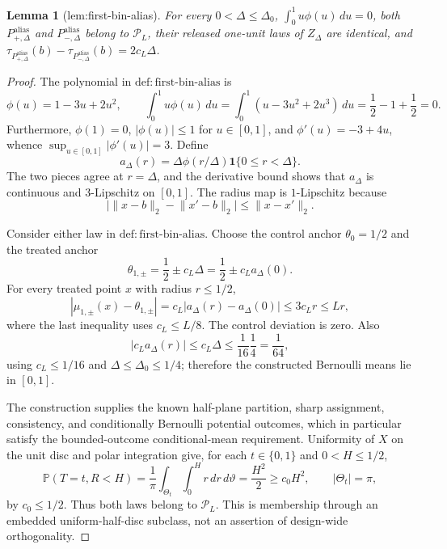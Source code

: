 \documentclass{article}
\newtheorem{lemma}{Lemma}
\begin{document}
\begin{lemma}[lem:first-bin-alias]\label{lem:first-bin-alias}
For every \(0<\Delta\leq\Delta_0\), \(\int_0^1u\phi(u)\,du=0\), both \(P^{\mathrm{alias}}_{+,\Delta}\) and \(P^{\mathrm{alias}}_{-,\Delta}\) belong to \(\mathcal P_L\), their released one-unit laws of \(Z_\Delta\) are identical, and \(\tau_{P^{\mathrm{alias}}_{+,\Delta}}(b)-\tau_{P^{\mathrm{alias}}_{-,\Delta}}(b)=2c_L\Delta\).
\end{lemma}
\begin{proof}
The polynomial in \(\mathrm{def:first\text{-}bin\text{-}alias}\) is
\[
 \phi(u)=1-3u+2u^2,
 \qquad
 \int_0^1u\phi(u)\,du
 =\int_0^1(u-3u^2+2u^3)\,du
 =\frac12-1+\frac12=0.
\]
Furthermore, \(\phi(1)=0\), \(|\phi(u)|\leq1\) for \(u\in[0,1]\), and \(\phi'(u)=-3+4u\), whence \(\sup_{u\in[0,1]}|\phi'(u)|=3\).  Define
\[
 a_\Delta(r)=\Delta\phi(r/\Delta)\mathbf1\{0\leq r<\Delta\}.
\]
The two pieces agree at \(r=\Delta\), and the derivative bound shows that \(a_\Delta\) is continuous and \(3\)-Lipschitz on \([0,1]\).  The radius map is \(1\)-Lipschitz because
\[
 \bigl|\lVert x-b\rVert_2-\lVert x'-b\rVert_2\bigr|
 \leq\lVert x-x'\rVert_2.
\]

Consider either law in \(\mathrm{def:first\text{-}bin\text{-}alias}\).  Choose the control anchor \(\theta_0=1/2\) and the treated anchor
\[
 \theta_{1,\pm}=\frac12\pm c_L\Delta
 =\frac12\pm c_La_\Delta(0).
\]
For every treated point \(x\) with radius \(r\leq1/2\),
\[
 |\mu_{1,\pm}(x)-\theta_{1,\pm}|
 =c_L|a_\Delta(r)-a_\Delta(0)|
 \leq3c_Lr\leq Lr,
\]
where the last inequality uses \(c_L\leq L/8\).  The control deviation is zero.  Also
\[
 |c_La_\Delta(r)|\leq c_L\Delta
 \leq\frac1{16}\frac14=\frac1{64},
\]
using \(c_L\leq1/16\) and \(\Delta\leq\Delta_0\leq1/4\); therefore the constructed Bernoulli means lie in \([0,1]\).

The construction supplies the known half-plane partition, sharp assignment, consistency, and conditionally Bernoulli potential outcomes, which in particular satisfy the bounded-outcome conditional-mean requirement.  Uniformity of \(X\) on the unit disc and polar integration give, for each \(t\in\{0,1\}\) and \(0<H\leq1/2\),
\[
 \mathbb P(T=t,R<H)
 =\frac1\pi\int_{\Theta_t}\int_0^H r\,dr\,d\vartheta
 =\frac{H^2}{2}
 \geq c_0H^2,
 \qquad |\Theta_t|=\pi,
\]
by \(c_0\leq1/2\).  Thus both laws belong to \(\mathcal P_L\).  This is membership through an embedded uniform-half-disc subclass, not an assertion of design-wide orthogonality.


\end{proof}
\end{document}

